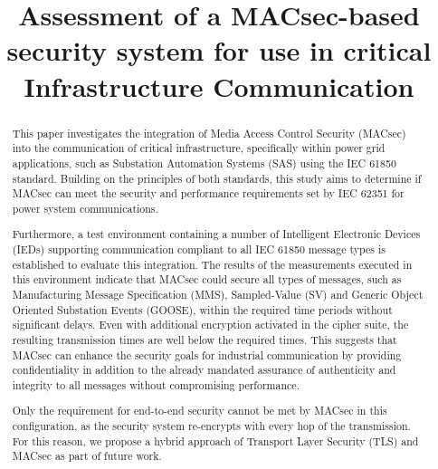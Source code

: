 \documentclass[conference, onecolumn, a4paper]{IEEEtran}
\begin{document}
\title{Assessment of a MACsec-based security system for use in critical Infrastructure Communication}

\author{
    \vspace{6 pt}
}

\maketitle

\begin{abstract}
    \noindent This paper investigates the integration of Media Access Control Security (MACsec) into the communication of critical infrastructure, 
    specifically within power grid applications, such as Substation Automation Systems (SAS) using the IEC 61850 standard. Building on the principles of both standards, this study aims 
    to determine if MACsec can meet the security and performance requirements set by IEC 62351 for power system communications.
    
    \smallskip
    \noindent Furthermore, a  test environment containing a number of Intelligent Electronic Devices (IEDs) supporting communication compliant to all IEC 
    61850 message types is established to evaluate this integration. The results of the measurements executed in this environment indicate that MACsec could 
    secure all types of messages, such as Manufacturing Message Specification (MMS), Sampled-Value (SV) and Generic Object Oriented Substation Events 
    (GOOSE), within the required time periods without significant delays. Even with additional encryption activated in the cipher suite, the resulting transmission times are well below the required times. This suggests that 
    MACsec can enhance the security goals for industrial communication by providing confidentiality in addition to the already mandated assurance of authenticity and integrity to all messages without compromising performance.

    \smallskip
    \noindent Only the requirement for end-to-end security cannot be met by MACsec in this configuration, as the security system re-encrypts with every hop of the transmission. For this reason, we propose a hybrid approach 
    of Transport Layer Security (TLS) and MACsec as part of future work. 
\end{abstract}
\end{document}
